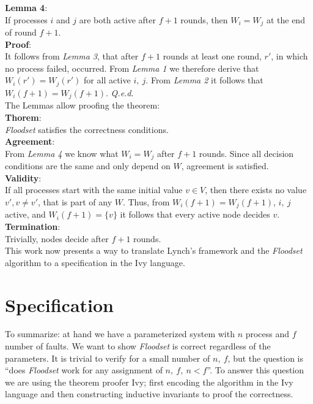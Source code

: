 \documentclass[fleqn]{article}
\begin{document}
\noindent \textbf{Lemma 4}:\\
If processes $i$ and $j$ are both active after $f+1$ rounds, then $W_i = W_j$ at the end of round $f + 1$.\\
\textbf{Proof}:\\
It follows from \textit{Lemma 3}, that after $f+1$ rounds at least one round, $r'$, in which no process failed, occurred. From \textit{Lemma 1} we therefore derive that $W_i(r') = W_j(r')$ for all active $i,\ j$.
From \textit{Lemma 2} it follows that $W_i(f+1) = W_j(f+1)$. \textit{Q.e.d}.\\

\noindent The Lemmas allow proofing the theorem:\\
\noindent \textbf{Thorem}:\\
\textit{Floodset} satisfies the correctness conditions.\\
\textbf{Agreement}:\\
From \textit{Lemma 4} we know what $W_i = W_j$ after $f+1$ rounds. Since all decision conditions are the same and only depend on $W$, agreement is satisfied.\\
\textbf{Validity}:\\
If all processes start with the same initial value $v \in V$, then there exists no value $v', v \neq v'$, that is part of any $W$. Thus, from $W_i(f+1) = W_j(f+1)$, $i,\ j$ active, and $W_i(f+1) = \{v\}$ it follows
that every active node decides $v$.\\
\textbf{Termination}:\\
Trivially, nodes decide after $f+1$ rounds.\\

This work now presents a way to translate Lynch's framework and the \textit{Floodset} algorithm to a specification in the Ivy language.

\section{Specification}
To summarize: at hand we have a parameterized system with $n$ process and $f$ number of faults. We want to show \textit{Floodset} is correct regardless of the parameters. It is trivial to verify for a small number of $n,\ f$, but the question is ``does \textit{Floodset} work for any assignment of $n,\ f,\ n < f$''.
To answer this question we are using the theorem proofer Ivy; first encoding the algorithm in the Ivy language and then constructing inductive invariants to proof the correctness.
\end{document}
